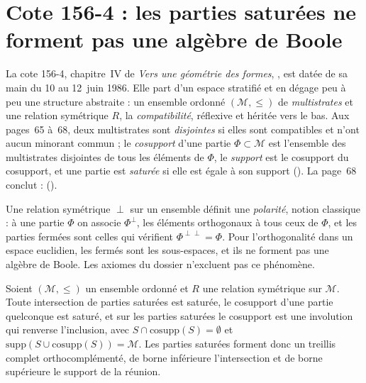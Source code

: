 \section[Cote 156-4 : les parties saturées ne forment pas une algèbre de Boole]{Cote 156-4 : les parties saturées ne forment pas une algèbre de Boole\protect{}}\label{sec:156-4}

La cote 156-4, chapitre~IV de \emph{Vers une géométrie des formes}, , est datée de sa main du 10 au 12~juin 1986. Elle part d'un espace stratifié et en dégage peu à peu une structure abstraite : un ensemble ordonné $(\mathcal M, \leq)$ de \emph{multistrates} et une relation symétrique $R$, la \emph{compatibilité}, réflexive et héritée vers le bas. Aux pages~65 à~68, deux multistrates sont \emph{disjointes} si elles sont compatibles et n'ont aucun minorant commun ; le \emph{cosupport} d'une partie $\Phi \subset \mathcal M$ est l'ensemble des multistrates disjointes de tous les éléments de $\Phi$, le \emph{support} est le cosupport du cosupport, et une partie est \emph{saturée} si elle est égale à son support (). La page~68 conclut :  ().

Une relation symétrique $\perp$ sur un ensemble définit une \emph{polarité}, notion classique : à une partie $\Phi$ on associe $\Phi^\perp$, les éléments orthogonaux à tous ceux de $\Phi$, et les parties fermées sont celles qui vérifient $\Phi^{\perp\perp} = \Phi$. Pour l'orthogonalité dans un espace euclidien, les fermés sont les sous-espaces, et ils ne forment pas une algèbre de Boole. Les axiomes du dossier n'excluent pas ce phénomène.

\begin{enonce}
Soient $(\mathcal M, \leq)$ un ensemble ordonné et $R$ une relation symétrique sur $\mathcal M$. Toute intersection de parties saturées est saturée, le cosupport d'une partie quelconque est saturé, et sur les parties saturées le cosupport est une involution qui renverse l'inclusion, avec $S \cap \mathrm{cosupp}(S) = \emptyset$ et $\mathrm{supp}(S \cup \mathrm{cosupp}(S)) = \mathcal M$. Les parties saturées forment donc un treillis complet orthocomplémenté, de borne inférieure l'intersection et de borne supérieure le support de la réunion.
\end{enonce}

